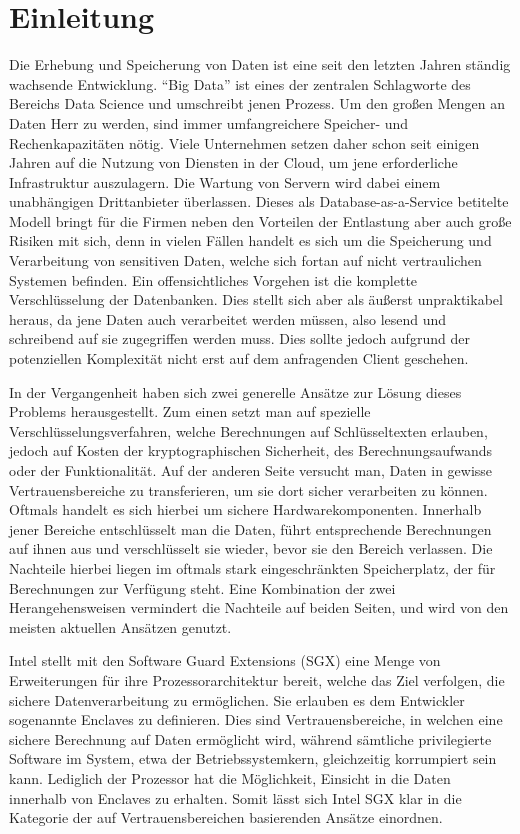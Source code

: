 
\chapter{Einleitung}

Die Erhebung und Speicherung von Daten ist eine seit den letzten Jahren ständig wachsende Entwicklung. "`Big Data"' ist eines der zentralen Schlagworte des Bereichs Data Science und umschreibt jenen Prozess. Um den großen Mengen an Daten Herr zu werden, sind immer umfangreichere Speicher- und Rechenkapazitäten nötig. Viele Unternehmen setzen daher schon seit einigen Jahren auf die Nutzung von Diensten in der Cloud, um jene erforderliche Infrastruktur auszulagern. Die Wartung von Servern wird dabei einem unabhängigen Drittanbieter überlassen. Dieses als Database-as-a-Service betitelte Modell bringt für die Firmen neben den Vorteilen der Entlastung aber auch große Risiken mit sich, denn in vielen Fällen handelt es sich um die Speicherung und Verarbeitung von sensitiven Daten, welche sich fortan auf nicht vertraulichen Systemen befinden. Ein offensichtliches Vorgehen ist die komplette Verschlüsselung der Datenbanken. Dies stellt sich aber als äußerst unpraktikabel heraus, da jene Daten auch verarbeitet werden müssen, also lesend und schreibend auf sie zugegriffen werden muss. Dies sollte jedoch aufgrund der potenziellen Komplexität nicht erst auf dem anfragenden Client geschehen.

In der Vergangenheit haben sich zwei generelle Ansätze zur Lösung dieses Problems herausgestellt. Zum einen setzt man auf spezielle Verschlüsselungsverfahren, welche Berechnungen auf Schlüsseltexten erlauben, jedoch auf Kosten der kryptographischen Sicherheit, des Berechnungsaufwands oder der Funktionalität. Auf der anderen Seite versucht man, Daten in gewisse Vertrauensbereiche zu transferieren, um sie dort sicher verarbeiten zu können. Oftmals handelt es sich hierbei um sichere Hardwarekomponenten. Innerhalb jener Bereiche entschlüsselt man die Daten, führt entsprechende Berechnungen auf ihnen aus und verschlüsselt sie wieder, bevor sie den Bereich verlassen. Die Nachteile hierbei liegen im oftmals stark eingeschränkten Speicherplatz, der für Berechnungen zur Verfügung steht. Eine Kombination der zwei Herangehensweisen vermindert die Nachteile auf beiden Seiten, und wird von den meisten aktuellen Ansätzen genutzt.
 
Intel stellt mit den Software Guard Extensions (SGX) eine Menge von Erweiterungen für ihre Prozessorarchitektur bereit, welche das Ziel verfolgen, die sichere Datenverarbeitung zu ermöglichen. Sie erlauben es dem Entwickler sogenannte Enclaves zu definieren. Dies sind Vertrauensbereiche, in welchen eine sichere Berechnung auf Daten ermöglicht wird, während sämtliche privilegierte Software im System, etwa der Betriebssystemkern, gleichzeitig korrumpiert sein kann. Lediglich der Prozessor hat die Möglichkeit, Einsicht in die Daten innerhalb von Enclaves zu erhalten. Somit lässt sich Intel SGX klar in die Kategorie der auf Vertrauensbereichen basierenden Ansätze einordnen.

